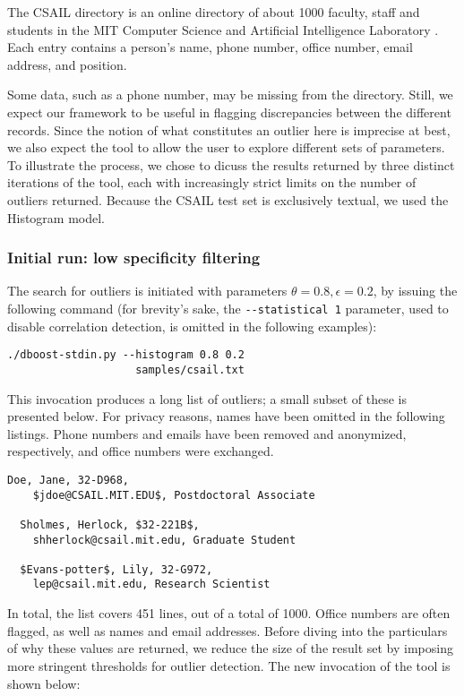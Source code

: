 The CSAIL directory is an online directory of about 1000 faculty, staff and students in the MIT Computer Science and Artificial Intelligence Laboratory \cite{CSAILDirectory}. Each entry contains a person's name, phone number, office number, email address, and position.

Some data, such as a phone number, may be missing from the directory. Still, we expect our framework to be useful in flagging discrepancies between the different records. Since the notion of what constitutes an outlier here is imprecise at best, we also expect the tool to allow the user to explore different sets of parameters. To illustrate the process, we chose to dicuss the results returned by three distinct iterations of the tool, each with increasingly strict limits on the number of outliers returned. Because the CSAIL test set is exclusively textual, we used the Histogram model.

\subsubsection{Initial run: low specificity filtering}
The search for outliers is initiated with parameters $\theta = 0.8, \epsilon = 0.2$, by issuing the following command (for brevity's sake, the \lstinline{--statistical 1} parameter, used to disable correlation detection, is omitted in the following examples):

\begin{lstlisting}[gobble=2]
  ./dboost-stdin.py --histogram 0.8 0.2 
                    samples/csail.txt
\end{lstlisting}

This invocation produces a long list of outliers; a small subset of these is presented below. For privacy reasons, names have been omitted in the following listings. Phone numbers and emails have been removed and anonymized, respectively, and office numbers were exchanged.

\begin{lstlisting}[gobble=2]
  Doe, Jane, 32-D968, 
    $jdoe@CSAIL.MIT.EDU$, Postdoctoral Associate

  Sholmes, Herlock, $32-221B$, 
    shherlock@csail.mit.edu, Graduate Student

  $Evans-potter$, Lily, 32-G972, 
    lep@csail.mit.edu, Research Scientist
\end{lstlisting}

In total, the list covers 451 lines, out of a total of 1000. Office numbers are often flagged, as well as names and email addresses. Before diving into the particulars of why these values are returned, we reduce the size of the result set by imposing more stringent thresholds for outlier detection. The new invocation of the tool is shown below: 

